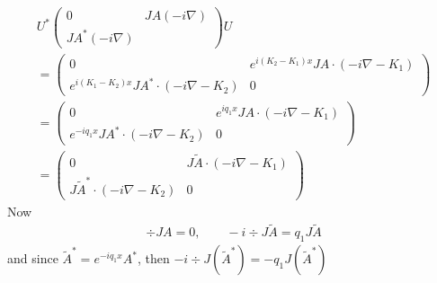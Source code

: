 \documentclass[11pt,a4paper,reqno,french,tikz]{amsart}
\newcommand{\pa}[1]{\left( #1 \right)} %
\newcommand{\na}{\nabla} %
\newcommand{\mat}[1]{\begin{pmatrix} #1 \end{pmatrix}} %
\begin{document}
\begin{multline*}
	U^* \mat{0 & JA (-i\na) \\ JA^* (-i\na)} U \\
	= \mat{0 & e^{i(K_2 - K_1)x} JA \cdot(-i\na - K_1) \\ e^{i(K_1 - K_2)x} JA^* \cdot(-i\na - K_2) & 0} \\
	= \mat{0 & e^{iq_1 x} JA \cdot(-i\na - K_1) \\ e^{-iq_1 x} JA^* \cdot(-i\na - K_2) & 0} \\
	= \mat{0 & J \widetilde{A} \cdot(-i\na - K_1) \\  J\widetilde{A}^* \cdot(-i\na - K_2) & 0}
\end{multline*}
Now
\begin{align*}
\div JA = 0,\qquad -i\div J \widetilde{A} = q_1 J \widetilde{A}
\end{align*}
and since $\widetilde{A}^* = e^{-iq_1 x} A^*$, then $-i\div J \pa{\widetilde{A}^*} = -q_1 J  \pa{\widetilde{A}^*}$
\end{document}
